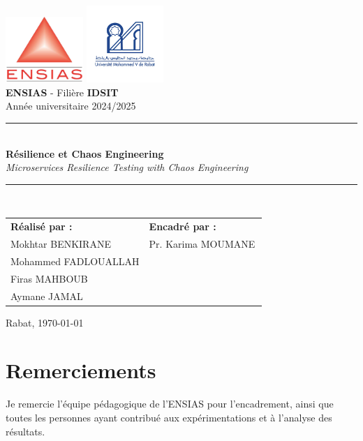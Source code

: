 \documentclass[a4paper,12pt,twoside]{report}
\newcommand{\titre}{Résilience et Chaos Engineering}
\newcommand{\encadrant}{Pr.\,\,Karima MOUMANE\,}
\newcommand{\filiere}{IDSIT}
\newcommand{\ecole}{ENSIAS}
\begin{document}
\begin{titlepage}
\begin{center}
\includegraphics[width=0.22\textwidth]{ensias}\hfill
\includegraphics[width=0.22\textwidth]{um5}\\[1.5cm]

{\Large \textbf{\ecole} - Filière \textbf{\filiere}}\\[0.6cm]
{\large Année universitaire 2024/2025}\\[1.5cm]

\rule{\textwidth}{1pt}\\[0.4cm]
{\LARGE \textbf{\titre}}\\[0.1cm]
{\large \textit{Microservices Resilience Testing with Chaos Engineering}}\\[0.4cm]
\rule{\textwidth}{1pt}\\[1.4cm]

\begin{tabular}{p{}p{}}
\textbf{Réalisé par :} & \textbf{Encadré par :}\\
Mokhtar BENKIRANE & \encadrant\\
Mohammed FADLOUALLAH & \\
Firas MAHBOUB & \\
Aymane JAMAL & \\
\end{tabular}

\vfill
Rabat, \today
\end{center}
\end{titlepage}

\chapter*{Remerciements}
Je remercie l'équipe pédagogique de l'ENSIAS pour l'encadrement, ainsi que toutes les personnes ayant contribué aux expérimentations et à l'analyse des résultats.
\end{document}
